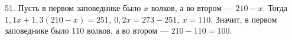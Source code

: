 51.  Пусть в первом заповеднике было $x$ волков, а во втором --- $210-x.$ Тогда $1,1x+1,3(210-x)=251,\ 0,2x=273-251,\ x=110.$ Значит, в первом заповеднике было 110 волков, а во втором --- $210-110=100.$\\
